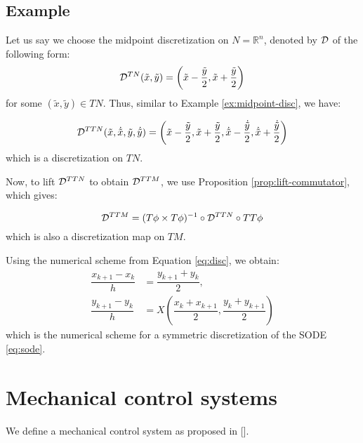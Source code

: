 \subsection{Example}
Let us say we choose the midpoint  discretization on $N={\mathbb R}^n$, denoted by $\mathcal{D}$ of the following form:
\begin{equation}
    \mathcal{D}^{TN}(\tilde{x}, \tilde{y}) = \left(\tilde{x} - \dfrac{\tilde{y}}{2}, \tilde{x} + \dfrac{\tilde{y}}{2} \right)
\end{equation}
for some $(\tilde{x}, \tilde{y}) \in TN$.
Thus, similar to Example \ref{ex:midpoint-disc}, we have:

\begin{equation}
    \mathcal{D}^{TTN}(\tilde{x}, \dot{\tilde{x}}, \tilde{y}, \dot{\tilde{y}}) = \left( \tilde{x} - \dfrac{\tilde{y}}{2}, \tilde{x} + \dfrac{\tilde{y}}{2}, \dot{\tilde{x}} - \dfrac{\dot{\tilde{y}}}{2}, \dot{\tilde{x}} + \dfrac{\dot{\tilde{y}}}{2}\right)
\end{equation}
which is a discretization on $TN$.

Now, to lift $\mathcal{D}^{TTN}$ to obtain $\mathcal{D}^{TTM}$, we use Proposition \ref{prop:lift-commutator}, which gives:

\begin{equation}
    \mathcal{D}^{TTM} = (T \phi \times T \phi)^{-1} \circ \mathcal{D}^{TTN} \circ TT\phi
\end{equation}
 which is also a discretization map on $TM$.

 Using the numerical scheme from Equation \eqref{eq:disc}, we obtain:
 \begin{equation}
     \begin{split}
         \dfrac{x_{k+1} - x_k}{h} & = \dfrac{y_{k+1} + y_k}{2}, \\
         \dfrac{y_{k+1} - y_k}{h} & = X \left(\dfrac{x_k + x_{k+1}}{2}, \dfrac{y_k + y_{k+1}}{2} \right)
     \end{split}
 \end{equation}
 which is the numerical scheme for a symmetric discretization of the SODE \eqref{eq:sode}.

\section{Mechanical control systems}

We define a mechanical control system as proposed in [\cite{10076262}].

